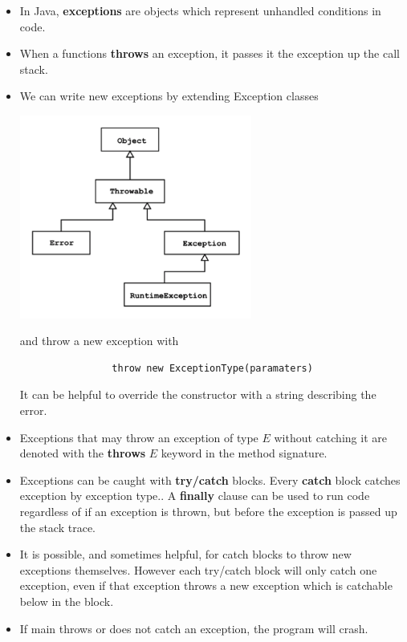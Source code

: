 \documentclass[letterpaper] {article}
\begin{document}
    \begin{itemize}
        \item In Java, \textbf{exceptions} are objects which represent unhandled conditions in code. 
        \item When a functions \textbf{throws} an exception, it passes it the exception up the call stack. 
        \item We can write new exceptions by extending Exception classes 
            \begin{center}
                \includegraphics[width=3in]{exceptions}
            \end{center}
            and throw a new exception with
            \begin{lstlisting}
                throw new ExceptionType(paramaters)
            \end{lstlisting}
            It can be helpful to override the constructor with a string describing the error. 
        \item Exceptions that may throw an exception of type $E$ without catching it are denoted with the \textbf{throws} $E$ keyword in the method signature. 
        \item Exceptions can be caught with \textbf{try/catch} blocks. Every \textbf{catch} block catches exception by exception type.. A \textbf{finally} clause can be used to run code regardless of if an exception is thrown, but before the exception is passed up the stack trace. 
        \item It is possible, and sometimes helpful, for catch blocks to throw new exceptions themselves. However each try/catch block will only catch one exception, even if that exception throws a new exception which is catchable below in the block. 
        \item If main throws or does not catch an exception, the program will crash. 
    \end{itemize}
\end{document}
